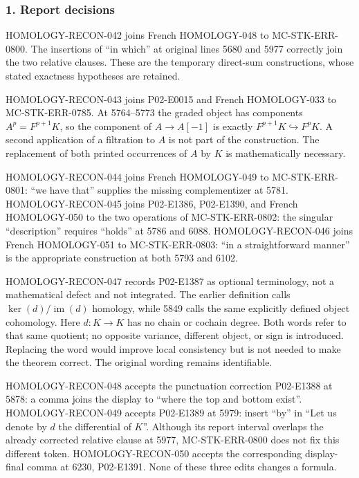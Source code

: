 \documentclass[11pt]{article}
\begin{document}
\subsubsection{1. Report decisions}\label{report-decisions}

HOMOLOGY-RECON-042 joins French HOMOLOGY-048 to MC-STK-ERR-0800. The insertions of ``in which'' at original lines 5680 and 5977 correctly join the two relative clauses. These are the temporary direct-sum constructions, whose stated exactness hypotheses are retained.

HOMOLOGY-RECON-043 joins P02-E0015 and French HOMOLOGY-033 to MC-STK-ERR-0785. At 5764--5773 the graded object has components \(A^p=F^{p+1}K\), so the component of \(A\to A[-1]\) is exactly \(F^{p+1}K\hookrightarrow F^pK\). A second application of a filtration to \(A\) is not part of the construction. The replacement of both printed occurrences of \(A\) by \(K\) is mathematically necessary.

HOMOLOGY-RECON-044 joins French HOMOLOGY-049 to MC-STK-ERR-0801: ``we have that'' supplies the missing complementizer at 5781. HOMOLOGY-RECON-045 joins P02-E1386, P02-E1390, and French HOMOLOGY-050 to the two operations of MC-STK-ERR-0802: the singular ``description'' requires ``holds'' at 5786 and 6088. HOMOLOGY-RECON-046 joins French HOMOLOGY-051 to MC-STK-ERR-0803: ``in a straightforward manner'' is the appropriate construction at both 5793 and 6102.

HOMOLOGY-RECON-047 records P02-E1387 as optional terminology, not a mathematical defect and not integrated. The earlier definition calls \(\ker(d)/\operatorname{im}(d)\) homology, while 5849 calls the same explicitly defined object cohomology. Here \(d:K\to K\) has no chain or cochain degree. Both words refer to that same quotient; no opposite variance, different object, or sign is introduced. Replacing the word would improve local consistency but is not needed to make the theorem correct. The original wording remains identifiable.

HOMOLOGY-RECON-048 accepts the punctuation correction P02-E1388 at 5878: a comma joins the display to ``where the top and bottom exist''. HOMOLOGY-RECON-049 accepts P02-E1389 at 5979: insert ``by'' in ``Let us denote by \(d\) the differential of \(K\)''. Although its report interval overlaps the already corrected relative clause at 5977, MC-STK-ERR-0800 does not fix this different token. HOMOLOGY-RECON-050 accepts the corresponding display-final comma at 6230, P02-E1391. None of these three edits changes a formula.
\end{document}

